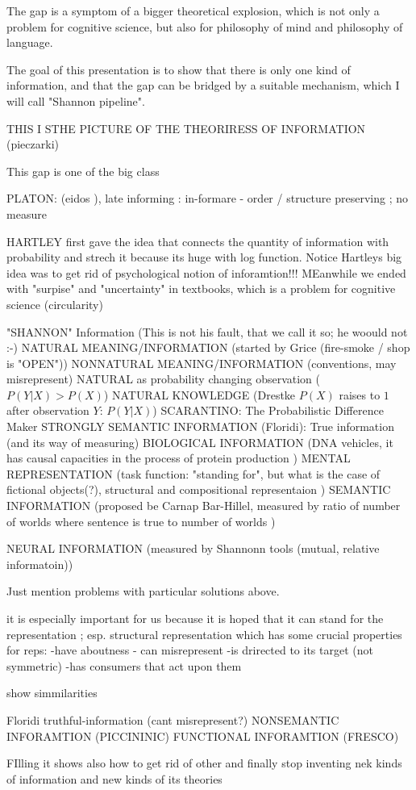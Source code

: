 \documentclass[10pt, aspectratio=169]{beamer}
\begin{document}
\begin{frame}[label=gap2]
    The gap is a symptom of a bigger theoretical explosion, which is not only a problem for cognitive science, but also for philosophy of mind and philosophy of language. 

    The goal of this presentation is to show that there is only one kind of information, and that the gap can be bridged by a suitable mechanism, which I will call "Shannon pipeline".

THIS I STHE PICTURE OF THE THEORIRESS OF INFORMATION 
(pieczarki)

    This gap is  one of the big class 

PLATON: (eidos ), late informing  : in-formare - order / structure  preserving ; no measure

 HARTLEY  first gave the idea that connects the quantity of information with probability and strech it because its huge with log function. Notice Hartleys big idea was to get rid of psychological notion of inforamtion!!! MEanwhile we ended with "surpise" and "uncertainty" in  textbooks, which is a  problem for cognitive science (circularity)

    "SHANNON" Information (This is not his fault, that we call it so; he woould not :-) 
    NATURAL MEANING/INFORMATION (started by Grice (fire-smoke / shop is "OPEN"))
    NONNATURAL MEANING/INFORMATION  (conventions, may misrepresent)
    NATURAL as probability changing observation ($P(Y|X) > P(X) $)
    NATURAL KNOWLEDGE (Drestke $P(X)$ raises to $1$ after observation $Y$:  $P(Y|X) $) 
    SCARANTINO: The Probabilistic Difference Maker 
    STRONGLY SEMANTIC INFORMATION (Floridi): True information  (and its way of measuring)
BIOLOGICAL INFORMATION (DNA vehicles, it has causal capacities in the process of protein production )
MENTAL REPRESENTATION (task function: "standing for", but what is the case of fictional objects(?), structural and compositional representaion )
SEMANTIC INFORMATION (proposed be  Carnap  Bar-Hillel, measured by  ratio of number of worlds where sentence is true to number of worlds )

    NEURAL INFORMATION (measured by Shannonn tools (mutual, relative informatoin))

Just mention problems with particular solutions above.

    it is especially important for us because it is hoped that it can stand for the representation ; esp. structural representation
    which has some crucial properties for reps:
        -have aboutness 
        - can misrepresent
        -is drirected to its target (not symmetric)
        -has consumers that act upon them

show simmilarities

Floridi truthful-information (cant misrepresent?)
NONSEMANTIC INFORAMTION (PICCININIC)
FUNCTIONAL INFORAMTION  (FRESCO)

    FIlling it shows also how to get rid of other and finally stop inventing nek kinds of information and new kinds of its theories


\end{frame}
\end{document}
